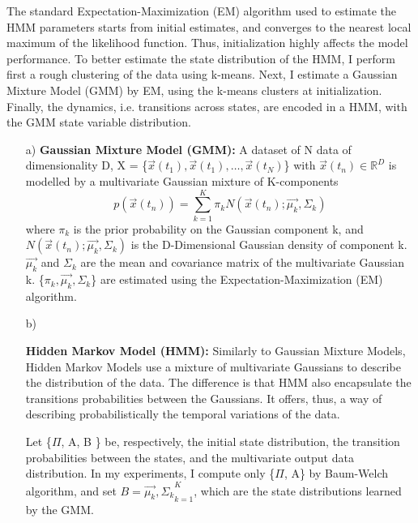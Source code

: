 \documentclass[conference]{IEEEtran}
\begin{document}
The standard Expectation-Maximization (EM) algorithm used to estimate the HMM parameters starts from initial estimates, and converges to the nearest local maximum of the likelihood function. Thus, initialization highly affects the model performance. To better estimate the state distribution of the HMM, I perform first a rough clustering of the data using k-means. Next, I estimate a Gaussian Mixture Model (GMM) by EM, using the k-means clusters at initialization. Finally, the dynamics, i.e. transitions across states, are encoded in a HMM, with the GMM state variable distribution.

\begin{itemize}
\item[a)]{
    \textbf{Gaussian Mixture Model (GMM):} A dataset of N data of dimensionality D, X = \{$\vec{x}(t_{1}), \vec{x}(t_{1}),\dots,\vec{x}(t_{N})$\} with $\vec{x}(t_{n}) \in \mathbb{R}^{D}$ is modelled by a multivariate Gaussian mixture of K-components
    \begin{equation}
        p(\vec{x}(t_{n})) = \sum_{k=1}^K \pi_{k} N (\vec{x}(t_{n}); \vec{\mu_{k}}, \Sigma_{k})
    \end{equation}
    where $\pi_{k}$ is the prior probability on the Gaussian component k, and $N (\vec{x}(t_{n}); \vec{\mu_{k}}, \Sigma_{k})$ is the D-Dimensional Gaussian density of component k. $\vec{\mu_{k}}$ and $\Sigma_{k}$ are the mean and covariance matrix of the multivariate Gaussian k. \{$\pi_{k}, \vec{\mu_{k}} , \Sigma_{k}$\} are estimated using the Expectation-Maximization (EM) algorithm.
}    
\\
\item[b)]{
    \textbf{Hidden Markov Model (HMM):} Similarly to Gaussian Mixture Models, Hidden Markov Models use a mixture of multivariate Gaussians to describe the distribution of the data.  The difference is that HMM also encapsulate the transitions probabilities between the Gaussians. It offers, thus, a way of describing probabilistically the temporal variations of the data.

    Let \{$\Pi$, A, B \} be, respectively, the initial state distribution, the transition probabilities between the states, and the multivariate output data distribution. In my experiments, I compute only \{$\Pi$, A\} by Baum-Welch algorithm, and set $B = {\vec{\mu_{k}}, \Sigma_{k}}_{k=1}^{K}$, which are the state distributions learned by the GMM. 
    
}
\end{itemize}
\end{document}
